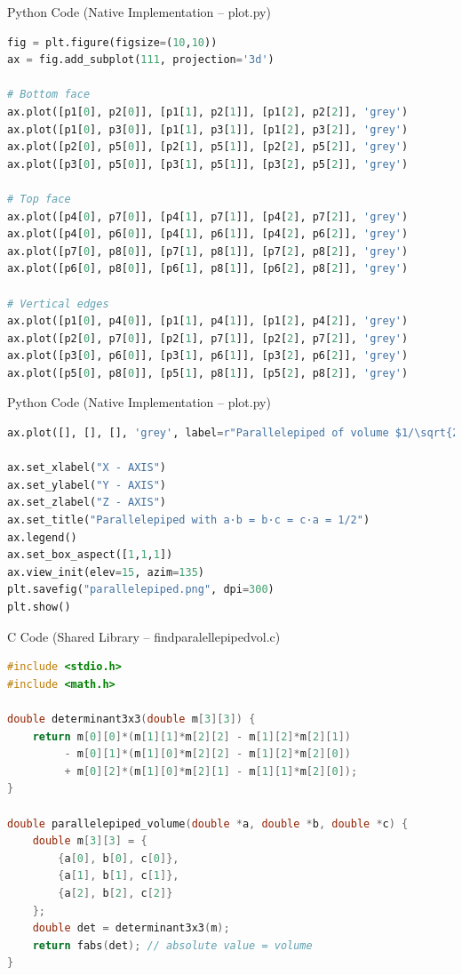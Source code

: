 \documentclass{beamer}
\begin{document}
\begin{frame}[fragile]{Python Code (Native Implementation – plot.py)}
\begin{lstlisting}[language=Python]
fig = plt.figure(figsize=(10,10))
ax = fig.add_subplot(111, projection='3d')

# Bottom face
ax.plot([p1[0], p2[0]], [p1[1], p2[1]], [p1[2], p2[2]], 'grey')
ax.plot([p1[0], p3[0]], [p1[1], p3[1]], [p1[2], p3[2]], 'grey')
ax.plot([p2[0], p5[0]], [p2[1], p5[1]], [p2[2], p5[2]], 'grey')
ax.plot([p3[0], p5[0]], [p3[1], p5[1]], [p3[2], p5[2]], 'grey')

# Top face
ax.plot([p4[0], p7[0]], [p4[1], p7[1]], [p4[2], p7[2]], 'grey')
ax.plot([p4[0], p6[0]], [p4[1], p6[1]], [p4[2], p6[2]], 'grey')
ax.plot([p7[0], p8[0]], [p7[1], p8[1]], [p7[2], p8[2]], 'grey')
ax.plot([p6[0], p8[0]], [p6[1], p8[1]], [p6[2], p8[2]], 'grey')

# Vertical edges
ax.plot([p1[0], p4[0]], [p1[1], p4[1]], [p1[2], p4[2]], 'grey')
ax.plot([p2[0], p7[0]], [p2[1], p7[1]], [p2[2], p7[2]], 'grey')
ax.plot([p3[0], p6[0]], [p3[1], p6[1]], [p3[2], p6[2]], 'grey')
ax.plot([p5[0], p8[0]], [p5[1], p8[1]], [p5[2], p8[2]], 'grey')
\end{lstlisting}
\end{frame}

\begin{frame}[fragile]{Python Code (Native Implementation – plot.py)}
\begin{lstlisting}[language=Python]
ax.plot([], [], [], 'grey', label=r"Parallelepiped of volume $1/\sqrt{2}$")

ax.set_xlabel("X - AXIS")
ax.set_ylabel("Y - AXIS")
ax.set_zlabel("Z - AXIS")
ax.set_title("Parallelepiped with a·b = b·c = c·a = 1/2")
ax.legend()
ax.set_box_aspect([1,1,1])
ax.view_init(elev=15, azim=135)
plt.savefig("parallelepiped.png", dpi=300)
plt.show()
\end{lstlisting}
\end{frame}

\begin{frame}[fragile]{C Code (Shared Library – findparalellepipedvol.c)}
\begin{lstlisting}[language=C]
#include <stdio.h>
#include <math.h>

double determinant3x3(double m[3][3]) {
    return m[0][0]*(m[1][1]*m[2][2] - m[1][2]*m[2][1])
         - m[0][1]*(m[1][0]*m[2][2] - m[1][2]*m[2][0])
         + m[0][2]*(m[1][0]*m[2][1] - m[1][1]*m[2][0]);
}

double parallelepiped_volume(double *a, double *b, double *c) {
    double m[3][3] = {
        {a[0], b[0], c[0]},
        {a[1], b[1], c[1]},
        {a[2], b[2], c[2]}
    };
    double det = determinant3x3(m);
    return fabs(det); // absolute value = volume
}
\end{lstlisting}
\end{frame}
\end{document}
